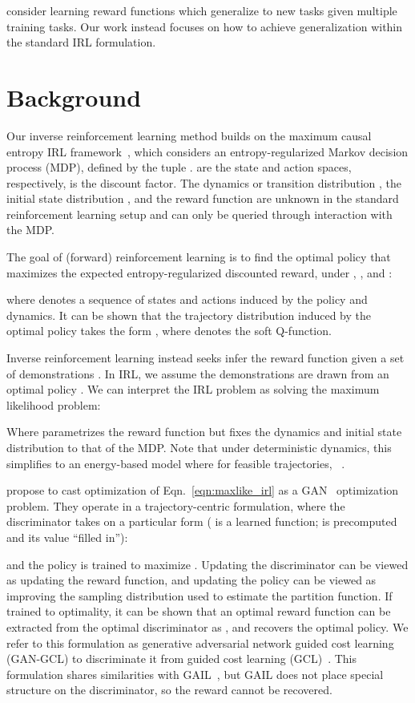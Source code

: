 \documentclass{article} \usepackage{iclr2018_conference,times}
\begin{document}
\citet{Amin17} consider learning reward functions which generalize to new tasks given multiple training tasks. Our work instead focuses on how to achieve generalization within the standard IRL formulation. 
\section{Background}
\label{sec:background}

Our inverse reinforcement learning method builds on the maximum causal entropy IRL framework~\citep{Ziebart10}, which considers an entropy-regularized Markov decision process (MDP), defined by the tuple .  are the state and action spaces, respectively,  is the discount factor. The dynamics or transition distribution , the initial state distribution , and the reward function  are unknown in the standard reinforcement learning setup and can only be queried through interaction with the MDP. 

The goal of (forward) reinforcement learning is to find the optimal policy  that maximizes the expected entropy-regularized discounted reward, under , , and :

where  denotes a sequence of states and actions induced by the policy and dynamics. It can be shown that the trajectory distribution induced by the optimal policy  takes the form  \citep{Ziebart10, Haarnoja2017}, where  denotes the soft Q-function.

Inverse reinforcement learning instead seeks infer the reward function  given a set of demonstrations . In IRL, we assume the demonstrations are drawn from an optimal policy . We can interpret the IRL problem as solving the maximum likelihood problem:

Where  parametrizes the reward function  but fixes the dynamics and initial state distribution to that of the MDP. Note that under deterministic dynamics, this simplifies to an energy-based model where for feasible trajectories, ~\citep{Ziebart08}.


\citet{Finn16b} propose to cast optimization of Eqn.~\ref{eqn:maxlike_irl} as a GAN~\citep{gan-goodfellow} optimization problem. They operate in a trajectory-centric formulation, where the discriminator takes on a particular form ( is a learned function;  is precomputed and its value ``filled in''):

and the policy  is trained to maximize . Updating the discriminator can be viewed as updating the reward function, and updating the policy can be viewed as improving the sampling distribution used to estimate the partition function. If trained to optimality, it can be shown that an optimal reward function can be extracted from the optimal discriminator as , and  recovers the optimal policy. We refer to this formulation as generative adversarial network guided cost learning (GAN-GCL) to discriminate it from guided cost learning (GCL)~\citep{Finn16b}. This formulation shares similarities with GAIL~\citep{Ho16b}, but GAIL does not place special structure on the discriminator, so the reward cannot be recovered.
 
\end{document}
